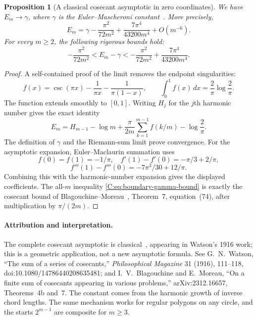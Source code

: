 \documentclass[11pt,a4paper]{article}
\newtheorem{proposition}[theorem]{Proposition}
\theoremstyle{definition}
\theoremstyle{remark}
\numberwithin{equation}{section}
\begin{document}
\begin{proposition}[A classical cosecant asymptotic in zero coordinates]
We have $E_m\to\gamma$, where $\gamma$ is the Euler--Mascheroni constant~\cite{R070}.
More precisely,
\[
 E_m=\gamma-\frac{\pi^2}{72m^2}
       +\frac{7\pi^4}{43200m^4}+O(m^{-6}).
\]
For every $m\ge2$, the following rigorous bounds hold:
\begin{equation}\label{C:eq:boundary-gamma-bound}
 -\frac{\pi^2}{72m^2}<E_m-\gamma
 <-\frac{\pi^2}{72m^2}+\frac{7\pi^4}{43200m^4}.
\end{equation}
\end{proposition}
\begin{proof}
A self-contained proof of the limit removes the endpoint singularities:
\[
 f(x)=\csc(\pi x)-\frac1{\pi x}-\frac1{\pi(1-x)},\qquad
 \int_0^1f(x)\,dx=\frac2\pi\log\frac2\pi.
\]
The function extends smoothly to $[0,1]$. Writing $H_j$ for the
$j$th harmonic number gives the exact identity
\[
 E_m=H_{m-1}-\log m
 +\frac\pi{2m}\sum_{k=1}^{m-1}f(k/m)-\log\frac2\pi.
\]
The definition of $\gamma$ and the Riemann-sum limit prove convergence.
For the asymptotic expansion, Euler--Maclaurin summation uses
\[
 f(0)=f(1)=-1/\pi,\quad
 f'(1)-f'(0)=-\pi/3+2/\pi,
\]
\[
 f'''(1)-f'''(0)=-7\pi^3/30+12/\pi.
\]
Combining this with the harmonic-number expansion gives the displayed
coefficients. The all-$m$ inequality \eqref{C:eq:boundary-gamma-bound}
is exactly the cosecant bound of Blagouchine--Moreau~\cite{R069}, Theorem~7, equation~(74),
after multiplication by $\pi/(2m)$.
\end{proof}

\paragraph{Attribution and interpretation.}
The complete cosecant asymptotic is classical~\cite{R068,R069}, appearing in Watson's
1916 work; this is a geometric application, not a new asymptotic
formula. See G.~N.~Watson, ``The sum of a series of cosecants,''
\emph{Philosophical Magazine} 31 (1916), 111--118,
doi:10.1080/14786440208635481; and I.~V.~Blagouchine and E.~Moreau,
``On a finite sum of cosecants appearing in various problems,''
arXiv:2312.16657, Theorems~4b and~7.
The constant comes from the harmonic growth of inverse chord lengths.
The same mechanism works for regular polygons on any circle, and the
starts $2^{m-1}$ are composite for $m\ge3$.
\end{document}
